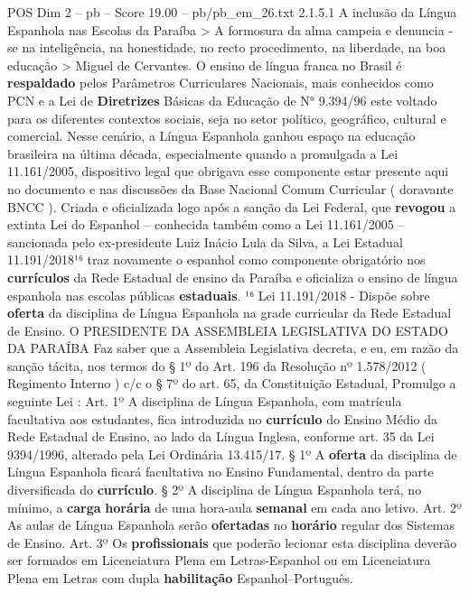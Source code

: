 \begin{textsample}{POS Dim 2 – pb – Score 19.00 – pb/pb\_em\_26.txt}  \label{ex:f2_pos_277}
2.1.5.1 A inclusão da Língua Espanhola nas Escolas da Paraíba > A formosura da alma campeia e denuncia -se na inteligência, na honestidade, no recto procedimento, na liberdade, na boa educação > Miguel de Cervantes.
O ensino de língua franca no Brasil é \textbf{respaldado} pelos Parâmetros Curriculares Nacionais, mais conhecidos como PCN e a Lei de \textbf{Diretrizes} Básicas da Educação de N{\EmojiFont °} 9.394/96 este voltado para os diferentes contextos sociais, seja no setor político, geográfico, cultural e comercial.
Nesse cenário, a Língua Espanhola ganhou espaço na educação brasileira na última década, especialmente quando a promulgada a Lei 11.161/2005, dispositivo legal que obrigava esse componente estar presente aqui no documento e nas discussões da Base Nacional Comum Curricular ( doravante BNCC ).
Criada e oficializada logo após a sanção da Lei Federal, que \textbf{revogou} a extinta Lei do Espanhol – conhecida também como a Lei 11.161/2005 – sancionada pelo ex-presidente Luiz Inácio Lula da Silva, a Lei Estadual 11.191/2018¹⁶ traz novamente o espanhol como componente obrigatório nos \textbf{currículos} da Rede Estadual de ensino da Paraíba e oficializa o ensino de língua espanhola nas escolas públicas \textbf{estaduais}. ¹⁶ Lei 11.191/2018 - Dispõe sobre \textbf{oferta} da disciplina de Língua Espanhola na grade curricular da Rede Estadual de Ensino.
O PRESIDENTE DA ASSEMBLEIA LEGISLATIVA DO ESTADO DA PARAÍBA Faz saber que a Assembleia Legislativa decreta, e eu, em razão da sanção tácita, nos termos do § 1º do Art. 196 da Resolução nº 1.578/2012 ( Regimento Interno ) c/c o § 7º do art. 65, da Constituição Estadual, Promulgo a seguinte Lei : Art. 1º A disciplina de Língua Espanhola, com matrícula facultativa aos estudantes, fica introduzida no \textbf{currículo} do Ensino Médio da Rede Estadual de Ensino, ao lado da Língua Inglesa, conforme art. 35 da Lei 9394/1996, alterado pela Lei Ordinária 13.415/17. § 1º A \textbf{oferta} da disciplina de Língua Espanhola ficará facultativa no Ensino Fundamental, dentro da parte diversificada do \textbf{currículo}. § 2º A disciplina de Língua Espanhola terá, no mínimo, a \textbf{carga} \textbf{horária} de uma hora-aula \textbf{semanal} em cada ano letivo.
Art. 2º As aulas de Língua Espanhola serão \textbf{ofertadas} no \textbf{horário} regular dos Sistemas de Ensino.
Art. 3º Os \textbf{profissionais} que poderão lecionar esta disciplina deverão ser formados em Licenciatura Plena em Letras-Espanhol ou em Licenciatura Plena em Letras com dupla \textbf{habilitação} Espanhol–Português.

\end{textsample}

